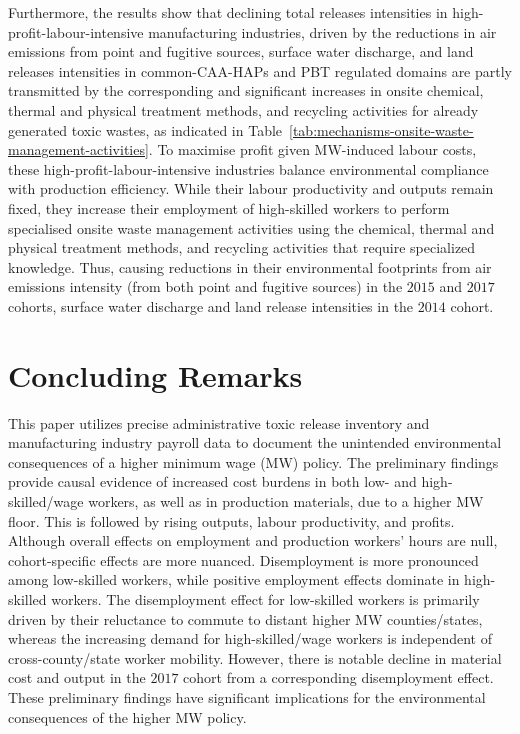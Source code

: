 \documentclass[authoryear, preprint, twocolumn, 1p]{elsarticle}
\begin{document}
    Furthermore, the results show that declining total releases intensities in high-profit-labour-intensive manufacturing industries, driven by the reductions in air emissions from point and fugitive sources, surface water discharge, and land releases intensities in common-CAA-HAPs and PBT regulated domains are partly transmitted by the corresponding and significant increases in onsite chemical, thermal and physical treatment methods, and recycling activities for already generated toxic wastes, as indicated in Table~\ref{tab:mechanisms-onsite-waste-management-activities}. To maximise profit given MW-induced labour costs, these high-profit-labour-intensive industries balance environmental compliance with production efficiency. While their labour productivity and outputs remain fixed, they increase their employment of high-skilled workers to perform specialised onsite waste management activities using the chemical, thermal and physical treatment methods, and recycling activities that require specialized knowledge. Thus, causing reductions in their environmental footprints from air emissions intensity (from both point and fugitive sources) in the $2015$ and $2017$ cohorts, surface water discharge and land release intensities in the $2014$ cohort.


    \section{Concluding Remarks}\label{sec:concluding-remarks}
    This paper utilizes precise administrative toxic release inventory and manufacturing industry payroll data to document the unintended environmental consequences of a higher minimum wage (MW) policy. The preliminary findings provide causal evidence of increased cost burdens in both low- and high-skilled/wage workers, as well as in production materials, due to a higher MW floor. This is followed by rising outputs, labour productivity, and profits. Although overall effects on employment and production workers' hours are null, cohort-specific effects are more nuanced. Disemployment is more pronounced among low-skilled workers, while positive employment effects dominate in high-skilled workers. The disemployment effect for low-skilled workers is primarily driven by their reluctance to commute to distant higher MW counties/states, whereas the increasing demand for high-skilled/wage workers is independent of cross-county/state worker mobility. However, there is notable decline in material cost and output in the $2017$ cohort from a corresponding disemployment effect. These preliminary findings have significant implications for the environmental consequences of the higher MW policy.
\end{document}
